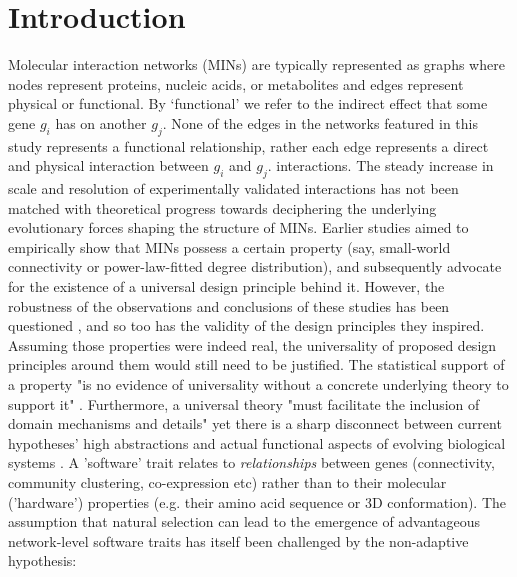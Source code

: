 \section{Introduction}
        Molecular interaction networks (MINs) are typically represented as graphs where nodes represent proteins, nucleic acids, or metabolites and edges represent physical or functional. By `functional' we refer to the indirect effect that some gene $g_i$ has on another $g_j$. None of the edges in the networks featured in this study represents a functional relationship, rather each edge represents a direct and physical interaction between  $g_i$ and  $g_j$.
        interactions. The steady increase in scale \cite{rolland_proteome-scale_2014} and resolution \cite{yang_widespread_2016} of experimentally validated interactions has not been matched with theoretical progress towards deciphering the underlying evolutionary forces shaping the structure of MINs. Earlier studies aimed to empirically show that MINs possess a certain property (say, small-world connectivity or power-law-fitted degree distribution), and subsequently advocate for the existence of a universal design principle behind it. However, the robustness of the observations and conclusions of these studies \cite{barabasi_emergence_1999, fell_small_2000} has been questioned \cite{arita_metabolic_2004, tanaka_protein_2005, fox_keller_revisiting_2005, khanin_how_2006}, and so too \cite{stelling_robustness_2004, hahn_molecular_2004} %
        has the validity of the design principles \cite{albert_error_2000, barabasi_network_2004} they inspired. Assuming those properties were indeed real, the universality of proposed design principles around them would still need to be justified. The statistical support of a property "is no evidence of universality without a concrete underlying theory to support it" \cite{stumpf_critical_2012}. Furthermore, a universal theory "must facilitate the inclusion of domain mechanisms and details" yet there is a sharp disconnect between current hypotheses' high abstractions and actual functional aspects of evolving biological systems \cite{alderson_contrasting_2010}.
        A 'software' trait relates to \textit{relationships} between genes (connectivity, community clustering, co-expression etc) rather than to their molecular ('hardware') properties (e.g. their amino acid sequence or 3D conformation).
        The assumption that natural selection can lead to the emergence of advantageous network-level software traits has itself been challenged by the non-adaptive hypothesis: %
